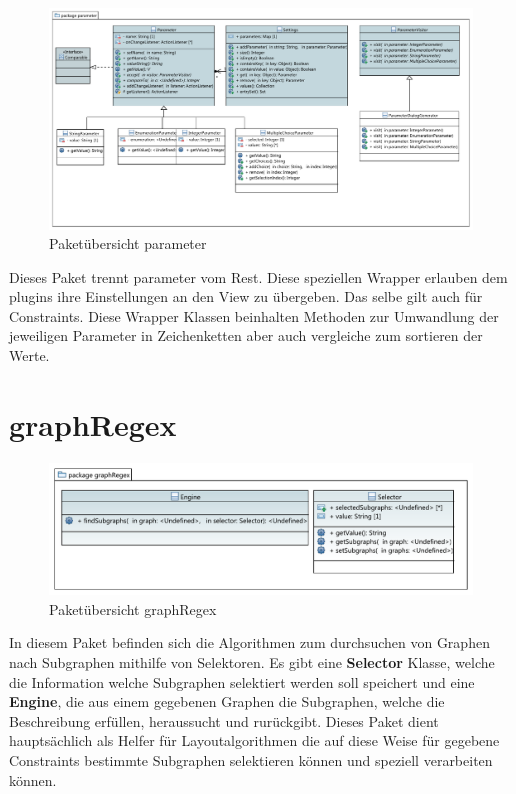 \begin{figure}[hb]
  \centering
  \includegraphics[width=380pt]{resourcen/parameter.pdf}
  \caption{Paketübersicht parameter}
  \label{fig:packge_parameter}
\end{figure}

Dieses Paket trennt parameter vom Rest. Diese speziellen Wrapper erlauben dem plugins ihre Einstellungen an den View zu übergeben. Das selbe gilt auch für Constraints. Diese Wrapper Klassen beinhalten Methoden zur Umwandlung der jeweiligen Parameter in Zeichenketten aber auch vergleiche zum sortieren der Werte.

\newpage

\section{graphRegex}

\begin{figure}[hb]
  \centering
  \includegraphics[width=380pt]{resourcen/graphRegex.pdf}
  \caption{Paketübersicht graphRegex}
  \label{fig:packge_graphRegex}
\end{figure}

In diesem Paket befinden sich die Algorithmen zum durchsuchen von Graphen nach Subgraphen mithilfe von Selektoren. Es gibt eine \textbf{Selector} Klasse, welche die Information welche Subgraphen selektiert werden soll speichert und eine \textbf{Engine}, die aus einem gegebenen Graphen die Subgraphen, welche die Beschreibung erfüllen, heraussucht und rurückgibt. Dieses Paket dient hauptsächlich als Helfer für Layoutalgorithmen die auf diese Weise für gegebene Constraints bestimmte Subgraphen selektieren können und speziell verarbeiten können.

